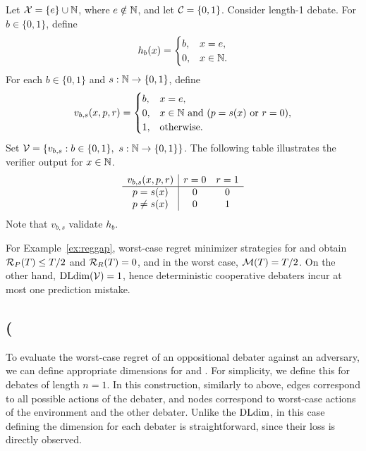 \documentclass[anon]{alt2027} %
\begin{document}
\begin{example}\label{ex:reggap}
Let ${\mathcal X}=\{e\}\cup\mathbb{N}$, where $e\notin\mathbb{N}$, and let
${{\mathcal C}}=\{0,1\}$. Consider length-1 debate. For $b\in\{0,1\}$, define
\[
h_b(x)=
\begin{cases}
b,&x=e,\\
0,&x\in\mathbb{N}.
\end{cases}
\]
For each $b\in\{0,1\}$ and $s:\mathbb{N}\to\{0,1\}$, define
\[
v_{b,s}(x,p,r)=
\begin{cases}
b,&x=e,\\
0,&x\in\mathbb{N}\text{ and }(p=s(x)\text{ or }r=0),\\
1,&\text{otherwise}.
\end{cases}
\]
Set $\V=\{v_{b,s}:b\in\{0,1\},\ s:\naturals\to\{0,1\}\}$.
The following table illustrates the verifier output for $x \in \mathbb{N}$.
\[
\begin{array}{c|cc}
v_{b,s}(x,{p},{r}) &{r}=0&{r}=1\\\hline
{p}=s(x)&0&0\\
{p} \ne s(x)&0&1
\end{array}
\]
Note that $v_{b,s}$ validate $h_b$.
\end{example}

\begin{theorem}\label{thm:reggap}
For Example~\ref{ex:reggap}, worst-case regret minimizer strategies for \df and \dt obtain ${{\mathcal R}_P}(T) \leq T/2$ and ${{\mathcal R}_R}(T) = 0$, and in the worst case, ${\mathcal M}(T) = T/2$.
On the other hand, $\mathrm{DLdim}({\mathcal V}) = 1$, hence deterministic cooperative debaters incur at most one prediction mistake. 
\end{theorem}












\iffalse
\subsection{(}

To evaluate the worst-case regret of an oppositional debater against an adversary, we can define appropriate dimensions for \dt and \df.
For simplicity, we define this for debates of length $n=1$. 
In this construction, similarly to above, edges correspond to all possible actions of the debater, and nodes correspond to worst-case actions of the environment and the other debater. Unlike the $\mathrm{DLdim}$, in this case defining the dimension for each debater is straightforward, since their loss is directly observed. 
\end{document}
